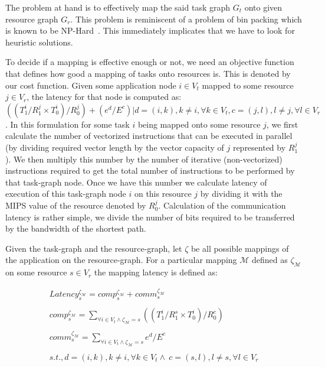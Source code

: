 \documentclass[10pt, conference, compsocconf]{IEEEtran}
\begin{document}
The problem at hand is to effectively map the said task graph $G_t$ onto
given resource graph $G_r$. This problem is reminiscent of a problem of
bin packing which is known to be NP-Hard~\cite{vsar89}. This immediately
implicates that we have to look for heuristic solutions.

To decide if a mapping is effective enough or not, we need an objective
function that defines how good a mapping of tasks onto resources
is. This is denoted by our cost function. Given some application node $i
\in V_t$ mapped to some resource $j \in V_r$, the latency for that node
is computed as: $((T^i_1/R^j_1\times T^i_0)/R^j_0) + (e^d/E^c) | d =
(i,k), k \neq i, \forall k \in V_t, c = (j,l), l \neq j, \forall l \in
V_r $. In this formulation for some task $i$ being mapped onto some
resource $j$, we first calculate the number of vectorized instructions
that can be executed in parallel (by dividing required vector length by
the vector capacity of $j$ represented by $R^j_1$). We then multiply
this number by the number of iterative (non-vectorized) instructions
required to get the total number of instructions to be performed by that
task-graph node. Once we have this number we calculate latency of
execution of this task-graph node $i$ on this resource $j$ by dividing
it with the MIPS value of the resource denoted by $R^j_0$. Calculation
of the communication latency is rather simple, we divide the number of
bits required to be transferred by the bandwidth of the shortest path.

Given the task-graph and the resource-graph, let $\zeta$ be all possible
mappings of the application on the resource-graph. For a particular
mapping $\mathcal{M}$ defined as $\zeta_\mathcal{M}$ on some resource $s
\in V_r$ the mapping latency is defined as:

\begin{equation}
  \begin{array}{c}
    Latency^{\zeta_\mathcal{M}}_s = comp^{\zeta_\mathcal{M}}_s +
comm^{\zeta_\mathcal{M}}_s\\
	\\comp^{\zeta_\mathcal{M}}_s = 
    \sum_{\forall i \in V_t \wedge
      \zeta_\mathcal{M} = s} ((T^i_1/R^s_1\times T^i_0)/R^c_0)\\
    \\comm^{\zeta_\mathcal{M}}_s =
    \sum_{\forall i \in V_t \wedge
      \zeta_\mathcal{M} = s} e^d / E^c\\ 
    \\s.t., d = (i,k), k \neq i, \forall k
    \in V_t \wedge\  c = (s,l), l \neq s, \forall l \in V_r
  \end{array}
  \label{eq:1}
\end{equation}
\end{document}

